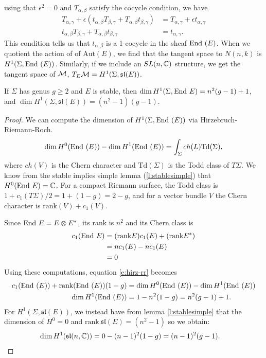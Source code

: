 	using that $\epsilon^2 = 0$ and $T_{\alpha,\beta}$ satisfy the cocycle condition, we have
	\begin{align*}
	T_{\alpha,\gamma} + \epsilon(t_{\alpha,\beta} T_{\beta,\gamma} + T_{\alpha,\beta} t_{\beta,\gamma}) &= T_{\alpha,\gamma} + \epsilon t_{\alpha,\gamma}\\
	t_{\alpha,\beta} T_{\beta,\gamma} + T_{\alpha,\beta} t_{\beta,\gamma} &= t_{\alpha,\gamma}.
	\end{align*}
	This condition tells us that $t_{\alpha,\beta}$ is a 1-cocycle in the sheaf $\text{End }(E)$. When we quotient the action of of $\text{Aut}(E)$, we find that the tangent space to $N(n,k)$ is $H^1(\Sigma,\text{End }(E))$. Similarly, if we include an $SL(n,\mathbb{C})$ structure, we get the tangent space of $\mathcal{M}$, $T_E\mathcal{M} = H^1(\Sigma,\mathfrak{sl}(E))$.
	
	\begin{theorem}
		If $\Sigma$ has genus $g\geq 2$ and $E$ is stable, then $\dim H^1(\Sigma,\text{End } E) = n^2(g-1)+1$, and $\dim H^1(\Sigma,\mathfrak{sl}(E)) = (n^2-1)(g-1)$.
	\end{theorem}
	\begin{proof}
		We can compute the dimension of $H^1(\Sigma,\text{End }(E))$ via Hirzebruch-Riemann-Roch. 
		\begin{equation}
			\label{e:hirz-rr}
			\dim H^0(\text{End }(E)) - \dim H^1(\text{End }(E)) = \int_\Sigma ch(L)\text{Td}(\Sigma),
		\end{equation}
		where $ch(V)$ is the Chern character and $\text{Td}(\Sigma)$ is the Todd class of $T\Sigma$. We know from the stable implies simple lemma (\ref{l:stablesimple}) that $H^0(\text{End } E)=\mathbb{C}$. For a compact Riemann surface, the Todd class is $1+c_1(T\Sigma)/2 = 1+(1-g) = 2-g$, and for a vector bundle $V$ the Chern character is $\text{rank}(V) + c_1(V)$. 
		
		Since $\text{End } E = E\otimes E^\ast$, its rank is $n^2$ and its Chern class is
		\begin{align*}
			c_1(\text{End } E) &= (\text{rank} E) c_1(E) + (\text{rank} E^\ast)\\
			&= n c_1(E) - nc_1(E)\\
			&= 0
		\end{align*}
		Using these computations, equation \ref{e:hirz-rr} becomes 
		\begin{align*}
			c_1(\text{End }(E)) + \text{rank}(\text{End }(E))(1-g) &= \dim H^0(\text{End }(E)) - \dim H^1(\text{End }(E))\\
			\dim H^1(\text{End }(E)) &= 1 - n^2(1-g) = n^2(g-1) + 1.
		\end{align*}
		For $H^1(\Sigma,\mathfrak{sl}(E))$, we instead have from lemma \ref{l:stablesimple} that the dimension of $H^0 = 0$ and $\text{rank}~\mathfrak{sl}(E) = (n^2-1)$ so we obtain:
		\begin{align*}
			\dim H^1(\mathfrak{sl}(n,\mathbb{C})) &=  0-(n-1)^2(1-g) = (n-1)^2(g-1).
		\end{align*}
	\end{proof}

